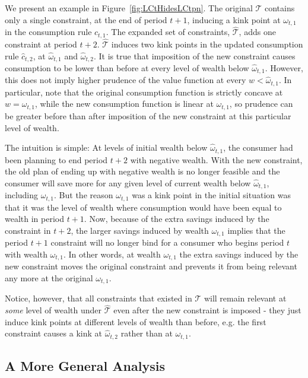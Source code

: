 \documentclass[titlepage]{\econtex}
\providecommand{\wAlt}{\omega}
\begin{document}
  We present an example in Figure~\ref{fig:LCtHidesLCtpn}. The original $\mathcal{T}$ contains only a single constraint, at the end of period $t+1$, inducing a kink point at $\wAlt_{t,1}$ in the consumption rule $c_{t,1}$. The expanded set of constraints, $\hat{\mathcal{T}}$, adds one constraint at period $t+2$. $\hat{\mathcal{T}}$ induces two kink points in the updated consumption rule $\hat{c}_{t,2}$, at $\hat{\wAlt}_{t,1}$ and $\hat{\wAlt}_{t,2}$.  It is true that imposition of the new constraint causes consumption to be lower than before at every level of wealth below $\hat{\wAlt}_{t,1}$.  However, this does not imply higher prudence of the value function at every $w <\hat{\wAlt}_{t,1}$.  In particular, note that the original consumption function is strictly concave at $w = \wAlt_{t,1}$, while the new consumption function is linear at $\wAlt_{t,1}$, so prudence can be greater before than after imposition of the new constraint at this particular level of wealth.

  The intuition is simple: At levels of initial wealth below $\hat{\wAlt}_{t,1}$, the consumer had been planning to end period $t+2$ with negative wealth. With the new constraint, the old plan of ending up with negative wealth is no longer feasible and the consumer will save more for any given level of current wealth below $\hat{\wAlt}_{t,1}$, including $\wAlt_{t,1}$. But the reason $\wAlt_{t,1}$ was a kink point in the initial situation was that it was the level of wealth where consumption would have been equal to wealth in period $t+1$. Now, because of the extra savings induced by the constraint in $t+2$, the larger savings induced by wealth $\wAlt_{t,1}$ implies that the period $t+1$ constraint will no longer bind for a consumer who begins period $t$ with wealth $\wAlt_{t,1}$. In other words, at wealth $\wAlt_{t,1}$ the extra savings induced by the new constraint moves the original constraint and prevents it from being relevant any more at the original $\wAlt_{t,1}$.

  Notice, however, that all constraints that existed in $\mathcal{T}$ will remain relevant at \textit{some} level of wealth under $\hat{\mathcal{T}}$ even after the new constraint is imposed - they just induce kink points at different levels of wealth than before, e.g. the first constraint causes a kink at $\hat{\wAlt}_{t,2}$ rather than at $\wAlt_{t,1}$.

  \subsection{A More General Analysis}
  \label{subsubsec:MoreGenConstr}
\end{document}
